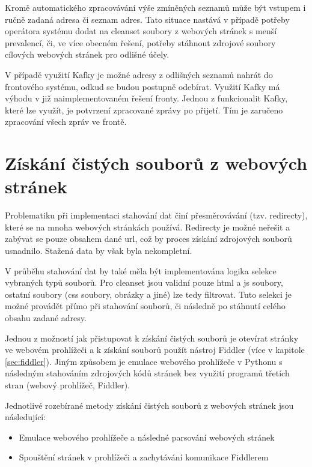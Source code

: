 \documentclass[thesis=M,czech,hidelinks]{FITthesis}[2013/05/06]
\begin{document}
Kromě automatického zpracovávání výše zmíněných seznamů může být vstupem i ručně zadaná adresa či seznam adres. Tato situace nastává v případě potřeby operátora systému dodat na cleanset soubory z webových stránek s menší prevalencí, či, ve více obecném řešení, potřeby stáhnout zdrojové soubory cílových webových stránek pro odlišné účely.

V případě využití Kafky je možné adresy z odlišných seznamů nahrát do frontového systému, odkud se budou postupně odebírat. Využití Kafky má výhodu v již naimplementovaném řešení fronty. Jednou z funkcionalit Kafky, které lze využít, je potvrzení zpracované zprávy po přijetí. Tím je zaručeno zpracování všech zpráv ve frontě. 





\section{Získání čistých souborů z webových stránek}
Problematiku při implementaci stahování dat činí přesměrovávání (tzv. redirecty), které se na mnoha webových stránkách používá. Redirecty je možné neřešit a zabývat se pouze obsahem dané url, což by proces získání zdrojových souborů usnadnilo. Stažená data by však byla nekompletní.

V průběhu stahování dat by také měla být implementována logika selekce vybraných typů souborů. Pro cleanset jsou validní pouze html a js soubory, ostatní soubory (css soubory, obrázky a jiné) lze tedy filtrovat. Tuto selekci je možné provádět přímo při stahování souborů, či následně po stáhnutí celého obsahu zadané adresy.

Jednou z možností jak přistupovat k získání čistých souborů je otevírat stránky ve webovém prohlížeči a k získání souborů použít nástroj Fiddler (více v kapitole \ref{sec:fiddler}). Jiným způsobem je emulace webového prohlížeče v Pythonu s následným stahováním zdrojových kódů stránek bez využití programů třetích stran (webový prohlížeč, Fiddler).

Jednotlivé rozebírané metody získání čistých souborů z webových stránek jsou následující:
\begin{itemize}
	\item Emulace webového prohlížeče a následné parsování webových stránek 
	\item Spouštění stránek v prohlížeči a zachytávání komunikace Fiddlerem
\end{itemize}
\end{document}
